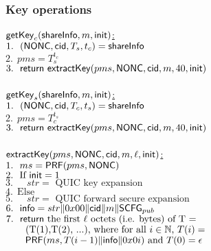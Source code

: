 \subsubsection{Key operations}
\noindent
\underline{$\mathsf{getKey}_c(\mathsf{shareInfo}, m, \mathsf{init})$:} \\
 $1.\ \ (\mathsf{NONC}, \mathsf{cid} ,T_s, t_c) = \mathsf{shareInfo}$ \\
 $2.\ \ pms = T_s^{t_c}$ \\
 $3.\ \ \mathsf{return}\ \mathsf{extractKey}(pms, \mathsf{NONC}, \mathsf{cid}, m, 40, \mathsf{init})$ \\
\\
\underline{$\mathsf{getKey}_s(\mathsf{shareInfo}, m, \mathsf{init})$:} \\
 $1.\ \ (\mathsf{NONC}, \mathsf{cid} ,T_c, t_s) = \mathsf{shareInfo}$ \\
 $2.\ \ pms = T_c^{t_s}$ \\
 $3.\ \ \mathsf{return}\ \mathsf{extractKey}(pms, \mathsf{NONC}, \mathsf{cid}, m, 40, \mathsf{init})$ \\
\\
\underline{$\mathsf{extractKey}(pms, \mathsf{NONC}, \mathsf{cid}, m, \ell, \mathsf{init})$:}\\
 $1.\ \ ms = \mathsf{PRF}(pms, \mathsf{NONC})$ \\
 $2.\ \ \text{If } \mathsf{init} = 1$ \\
 $3.\ \ \quad str = \text{ QUIC key expansion }$ \\
 $4.\ \ \text{Else }$ \\
 $5.\ \ \quad str = \text{ QUIC forward secure expansion }$ \\
 $6.\ \ \mathsf{info} = str \| 0x00 \| \mathsf{cid} \| m \| \mathsf{SCFG}_{pub}$ \\
 $7.\ \ \mathsf{return}\ \text{the first $\ell$ octets (i.e. bytes) of T = }$ \\
 $\quad \quad \text{(T(1),T(2), ...), where for all $i \in \mathbb{N}$, $T(i) = $} $\\
 $\quad \quad \text{$\mathsf{PRF}(ms, T(i-1) \| \mathsf{info} \| 0x0i)$ and $T(0) = \epsilon$} $\\
\\
